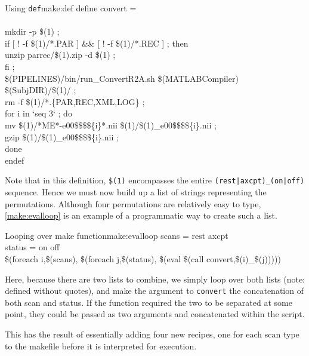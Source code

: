 \begin{make}{Using \texttt{def}}{make:def}
	define convert = \\
	 \\
	\tab mkdir -p \$(1) ;\ \\
	\tab if [ ! -f \$(1)/*.PAR ] \&\& [ ! -f \$(1)/*.REC ] ; then \ \\
	\tab unzip parrec/\$(1).zip -d \$(1) ;\ \\
	\tab fi ;\ \\
	\tab \$(PIPELINES)/bin/run_ConvertR2A.sh \$(MATLABCompiler) \$(SubjDIR)/\$(1)/ ;\ \\
	\tab rm -f \$(1)/*.\{PAR,REC,XML,LOG\} ;\ \\
	\tab for i in `seq 3` ; do \ \\
	\tab mv \$(1)/*ME*-e00\$\$\$\$\{i\}*.nii \$(1)/\$(1)_e00\$\$\$\$\{i\}.nii ;\ \\
	\tab gzip \$(1)/\$(1)_e00\$\$\$\$\{i\}.nii ;\ \\
	\tab done\\
	
	endef
\end{make}

Note that in this definition, \texttt{\$(1)} encompasses the entire \texttt{(rest|axcpt)_(on|off)} sequence. Hence we must now build up a list of strings representing the permutations. Although four permutations are relatively easy to type, \autoref{make:evalloop} is an example of a programmatic way to create such a list.

\begin{make}{Looping over make function}{make:evalloop}
	scans = rest axcpt \\
	status = on off \\
	
	\$(foreach i,\$(scans), \$(foreach j,\$(status), \$(eval \$(call convert,\$(i)_\$(j)))))
\end{make}

Here, because there are two lists to combine, we simply loop over both lists (note: defined without quotes), and make the argument to \texttt{convert} the concatenation of both scan and status. If the function required the two to be separated at some point, they could be passed as two arguments and concatenated within the script.

This has the result of essentially adding four new recipes, one for each scan type to the makefile before it is interpreted for execution.


